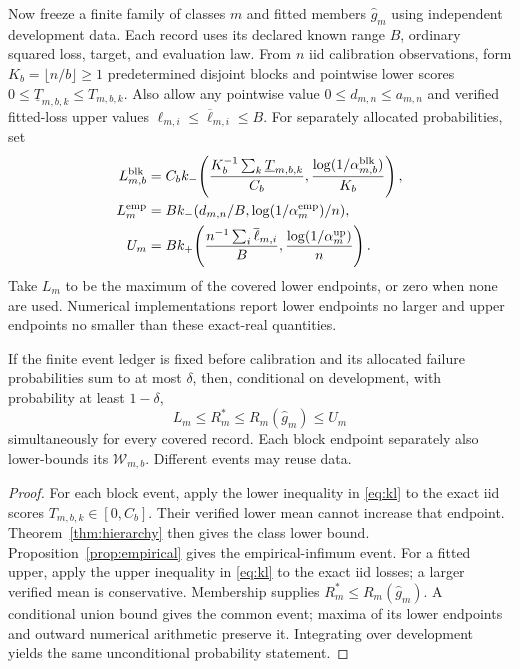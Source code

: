 Now freeze a finite family of classes $m$ and fitted members $\widehat g_m$
using independent development data. Each record uses its declared known
range $B$, ordinary squared loss, target, and evaluation law. From $n$ iid
calibration observations, form $K_b=\lfloor n/b\rfloor\geq1$
predetermined disjoint blocks and pointwise lower scores
$0\leq\underline T_{m,b,k}\leq T_{m,b,k}$.
Also allow any pointwise value $0\leq d_{m,n}\leq a_{m,n}$ and verified
fitted-loss upper values $\ell_{m,i}\leq\overline\ell_{m,i}\leq B$.
For separately allocated probabilities, set
\begin{align}
 L^{\rm blk}_{m,b}
 &=C_b k_-\!\left(
     \frac{K_b^{-1}\sum_k\underline T_{m,b,k}}{C_b},
     \frac{\log(1/\alpha^{\rm blk}_{m,b})}{K_b}\right),
        \label{eq:Lblock}\\
 L^{\rm emp}_m
 &=B k_-(d_{m,n}/B,\log(1/\alpha^{\rm emp}_m)/n),
        \label{eq:Lemp}\\
 U_m&=B k_+\!\left(
       \frac{n^{-1}\sum_i\overline\ell_{m,i}}B,
       \frac{\log(1/\alpha^{\rm up}_m)}n\right).
        \label{eq:upper}
\end{align}
Take $L_m$ to be the maximum of the covered lower endpoints, or zero
when none are used. Numerical implementations report lower endpoints no
larger and upper endpoints no smaller than these exact-real quantities.

\begin{theorem}
\label{thm:certificate}
If the finite event ledger is fixed before calibration and its allocated
failure probabilities sum to at most $\delta$, then, conditional on
development, with probability at least $1-\delta$,
\begin{equation}
 L_m\leq R_m^*\leq R_m(\widehat g_m)\leq U_m
 \label{eq:sandwich}
\end{equation}
simultaneously for every covered record. Each block endpoint separately
also lower-bounds its $\mathcal W_{m,b}$. Different events may reuse data.
\end{theorem}

\begin{proof}
For each block event, apply the lower inequality in \eqref{eq:kl} to
the exact iid scores $T_{m,b,k}\in[0,C_b]$. Their verified lower mean
cannot increase that endpoint. Theorem~\ref{thm:hierarchy} then gives
the class lower bound. Proposition~\ref{prop:empirical} gives the
empirical-infimum event. For a fitted upper, apply the upper inequality
in \eqref{eq:kl} to the exact iid losses; a larger verified mean is
conservative. Membership supplies $R_m^*\leq R_m(\widehat g_m)$.
A conditional union bound gives the common event; maxima of its lower
endpoints and outward numerical arithmetic preserve it. Integrating over
development yields the same unconditional probability statement.
\end{proof}

